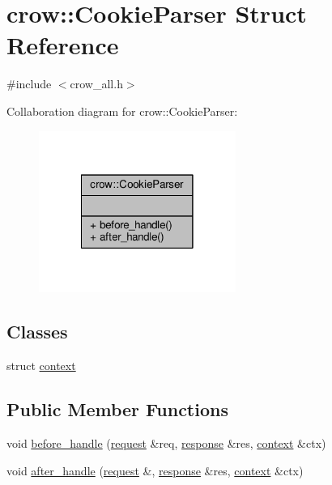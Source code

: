 \hypertarget{structcrow_1_1_cookie_parser}{\section{crow\-:\-:Cookie\-Parser Struct Reference}
\label{structcrow_1_1_cookie_parser}
}


{\ttfamily \#include $<$crow\-\_\-all.\-h$>$}



Collaboration diagram for crow\-:\-:Cookie\-Parser\-:
\nopagebreak
\begin{figure}[H]
\begin{center}
\leavevmode
\includegraphics[width=182pt]{structcrow_1_1_cookie_parser__coll__graph}
\end{center}
\end{figure}
\subsection*{Classes}
\begin{DoxyCompactItemize}
\item 
struct \hyperlink{structcrow_1_1_cookie_parser_1_1context}{context}
\end{DoxyCompactItemize}
\subsection*{Public Member Functions}
\begin{DoxyCompactItemize}
\item 
void \hyperlink{structcrow_1_1_cookie_parser_a85053375273cc6a217136315cfe9d181}{before\-\_\-handle} (\hyperlink{structcrow_1_1request}{request} \&req, \hyperlink{structcrow_1_1response}{response} \&res, \hyperlink{structcrow_1_1_cookie_parser_1_1context}{context} \&ctx)
\item 
void \hyperlink{structcrow_1_1_cookie_parser_af9b029207147ece8c18a28dd4b1d8f2c}{after\-\_\-handle} (\hyperlink{structcrow_1_1request}{request} \&, \hyperlink{structcrow_1_1response}{response} \&res, \hyperlink{structcrow_1_1_cookie_parser_1_1context}{context} \&ctx)
\end{DoxyCompactItemize}


